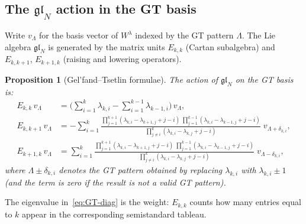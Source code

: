 \documentclass[12pt,a4paper]{article}
\newtheorem{proposition}[theorem]{Proposition}
\theoremstyle{definition}
\theoremstyle{remark}
\newcommand{\gl}{\mathfrak{gl}}
\begin{document}
\subsection{The $\gl_N$ action in the GT basis}

Write $v_\Lambda$ for the basis vector of $W^\lambda$ indexed by the
GT pattern $\Lambda$. The Lie algebra $\gl_N$ is generated by the
matrix units $E_{k,k}$ (Cartan subalgebra) and $E_{k,k+1}$,
$E_{k+1,k}$ (raising and lowering operators).

\begin{proposition}[Gel'fand--Tsetlin formulae]
\label{prop:GT-action}
The action of $\gl_N$ on the GT basis is:
\begin{align}
  E_{k,k}\, v_\Lambda
  &= \biggl(\sum_{i=1}^k \lambda_{k,i} - \sum_{i=1}^{k-1}
     \lambda_{k-1,i}\biggr)\, v_\Lambda,
  \label{eq:GT-diag} \\[6pt]
  E_{k,k+1}\, v_\Lambda
  &= -\sum_{i=1}^k
    \frac{\prod_{j=1}^{k+1}(\lambda_{k,i} - \lambda_{k+1,j} + j - i)
    \;\prod_{j=1}^{k-1}(\lambda_{k,i} - \lambda_{k-1,j} + j - i)}
    {\prod_{j \neq i}^{k}(\lambda_{k,i} - \lambda_{k,j} + j - i)}
    \; v_{\Lambda + \delta_{k,i}},
  \label{eq:GT-raise} \\[6pt]
  E_{k+1,k}\, v_\Lambda
  &= \sum_{i=1}^k
    \frac{\prod_{j=1}^{k+1}(\lambda_{k,i} - \lambda_{k+1,j} + j - i)
    \;\prod_{j=1}^{k-1}(\lambda_{k,i} - \lambda_{k-1,j} + j - i)}
    {\prod_{j \neq i}^{k}(\lambda_{k,i} - \lambda_{k,j} + j - i)}
    \; v_{\Lambda - \delta_{k,i}},
  \label{eq:GT-lower}
\end{align}
where $\Lambda \pm \delta_{k,i}$ denotes the GT pattern obtained by
replacing $\lambda_{k,i}$ with $\lambda_{k,i} \pm 1$ (and the term
is zero if the result is not a valid GT pattern).
\end{proposition}

The eigenvalue in~\eqref{eq:GT-diag} is the weight: $E_{k,k}$ counts
how many entries equal to $k$ appear in the corresponding semistandard
tableau.
\end{document}
